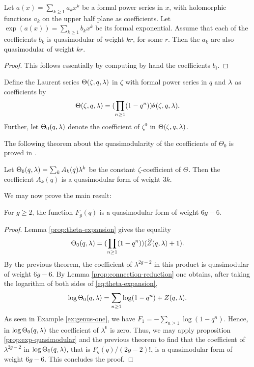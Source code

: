 \begin{prop} \label{prop:exp-quasimodular}
 Let $a(x)=\sum_{k\geq 1} a_k x^k$ be a formal power series in $x$, with holomorphic functions $a_k$ on the upper half plane as coefficients. Let $\exp(a(x))=\sum_{k\geq 1} b_k x^k$ be its formal exponential. Assume that each of the coefficients $b_k$ is quasimodular of weight $kr$, for some $r$. Then the $a_k$ are also quasimodular of weight $kr$.
\end{prop}
\begin{proof}
 This follows essentially by computing by hand the coefficients $b_i$.
\end{proof}

\begin{defi}
 Define the Laurent series $\Theta(\zeta,q,\lambda)$ in $\zeta$ with formal power series in $q$ and $\lambda$ as coefficients by
 \[
  \Theta(\zeta,q,\lambda)=(\prod_{n\geq 1}(1-q^n))\theta(\zeta,q,\lambda).
 \]
 Further, let $\Theta_0(q,\lambda)$ denote the coefficient of $\zeta^0$ in $\Theta(\zeta,q,\lambda)$.
\end{defi}

The following theorem about the quasimodularity of the coefficients of $\Theta_0$ is proved in \cite{Kaneko-Zagier1995}.

\begin{thm}
 Let $\Theta_0(q,\lambda)=\sum_{k}A_k(q)\lambda^k$ be the constant $\zeta$-coefficient of $\Theta$. Then the coefficient $A_k(q)$ is a quasimodular form of weight $3k$.
\end{thm}

We may now prove the main result:

\begin{thm}
 For $g\geq 2$, the function $F_g(q)$ is a quasimodular form of weight $6g-6$.
\end{thm}
\begin{proof}
 Lemma \ref{prop:theta-expansion} gives the equality
 \begin{equation} \label{eq:theta-expansion}
  \Theta_0(q,\lambda)=(\prod_{n\geq 1}(1-q^n))(\widehat{Z}(q,\lambda)+1).
 \end{equation}
 By the previous theorem, the coefficient of $\lambda^{2g-2}$ in this product is quasimodular of weight $6g-6$. By Lemma \ref{prop:connection-reduction} one obtains, after taking the logarithm of both sides of \eqref{eq:theta-expansion},
 \[
  \log\Theta_0(q,\lambda)=\sum_{n\geq 1}\log(1-q^n) + Z(q,\lambda).
 \]
 As seen in Example \ref{ex:genus-one}, we have $F_1=-\sum_{n\geq 1}\log(1-q^n)$. Hence, in $\log\Theta_0(q,\lambda)$ the coefficient of $\lambda^0$ is zero. Thus, we may apply proposition \ref{prop:exp-quasimodular} and the previous theorem to find that the coefficient of $\lambda^{2g-2}$ in $\log\Theta_0(q,\lambda)$, that is $F_g(q)/(2g-2)!$, is a quasimodular form of weight $6g-6$. This concludes the proof.
\end{proof}



